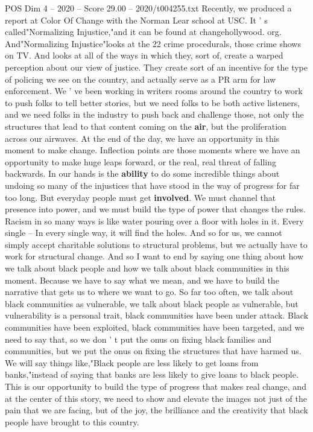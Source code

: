 \begin{textsample}{POS Dim 4 – 2020 – Score 29.00 – 2020/t004255.txt}
Recently, we produced a report at Color Of Change with the Norman Lear school at USC.
It ' s called"Normalizing Injustice,"and it can be found at changehollywood. org.
And"Normalizing Injustice"looks at the 22 crime procedurals, those crime shows on TV.
And looks at all of the ways in which they, sort of, create a warped perception about our view of justice.
They create sort of an incentive for the type of policing we see on the country, and actually serve as a PR arm for law enforcement.
We ' ve been working in writers rooms around the country to work to push folks to tell better stories, but we need folks to be both active listeners, and we need folks in the industry to push back and challenge those, not only the structures that lead to that content coming on the \textbf{air}, but the proliferation across our airwaves.
At the end of the day, we have an opportunity in this moment to make change.
Inflection points are those moments where we have an opportunity to make huge leaps forward, or the real, real threat of falling backwards.
In our hands is the \textbf{ability} to do some incredible things about undoing so many of the injustices that have stood in the way of progress for far too long.
But everyday people must get \textbf{involved}.
We must channel that presence into power, and we must build the type of power that changes the rules.
Racism in so many ways is like water pouring over a floor with holes in it.
Every single -- In every single way, it will find the holes.
And so for us, we cannot simply accept charitable solutions to structural problems, but we actually have to work for structural change.
And so I want to end by saying one thing about how we talk about black people and how we talk about black communities in this moment.
Because we have to say what we mean, and we have to build the narrative that gets us to where we want to go.
So far too often, we talk about black communities as vulnerable, we talk about black people as vulnerable, but vulnerability is a personal trait, black communities have been under attack.
Black communities have been exploited, black communities have been targeted, and we need to say that, so we don ' t put the onus on fixing black families and communities, but we put the onus on fixing the structures that have harmed us.
We will say things like,"Black people are less likely to get loans from banks,"instead of saying that banks are less likely to give loans to black people.
This is our opportunity to build the type of progress that makes real change, and at the center of this story, we need to show and elevate the images not just of the pain that we are facing, but of the joy, the brilliance and the creativity that black people have brought to this country.

\end{textsample}
